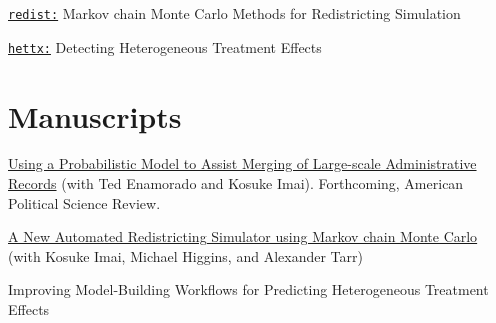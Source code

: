 \documentclass[]{deedy-resume-openfont}
\begin{document}
\begin{minipage}[t]{0.33\textwidth}
\href{https://github.com/kosukeimai/redist}{\texttt{redist:}} Markov chain Monte Carlo Methods for Redistricting Simulation\vspace{1mm}

\href{https://github.com/bfifield/hettx}{\texttt{hettx:}} Detecting Heterogeneous Treatment Effects
\sectionsep

\section{Manuscripts}
\href{https://imai.fas.harvard.edu/research/linkage.html}{Using a Probabilistic Model to Assist Merging of Large-scale Administrative Records} (with Ted Enamorado and Kosuke Imai). Forthcoming, American Political Science Review.\\\vspace{2mm}

\href{https://imai.fas.harvard.edu/research/files/redist.pdf}{A New Automated Redistricting Simulator using Markov chain Monte Carlo} (with Kosuke Imai, Michael Higgins, and Alexander Tarr)\\\vspace{2mm}

Improving Model-Building Workflows for Predicting Heterogeneous Treatment Effects\sectionsep

%
%

\end{minipage} 
\hfill
\end{document}
